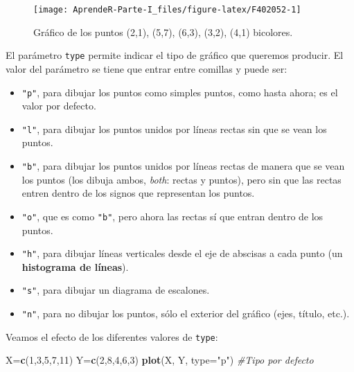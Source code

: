 \documentclass[]{book}
\newenvironment{Shaded}{\begin{snugshade}}{\end{snugshade}}
\newcommand{\CommentTok}[1]{\textcolor[rgb]{0.56,0.35,0.01}{\textit{#1}}}
\newcommand{\DataTypeTok}[1]{\textcolor[rgb]{0.13,0.29,0.53}{#1}}
\newcommand{\DecValTok}[1]{\textcolor[rgb]{0.00,0.00,0.81}{#1}}
\newcommand{\KeywordTok}[1]{\textcolor[rgb]{0.13,0.29,0.53}{\textbf{#1}}}
\newcommand{\NormalTok}[1]{#1}
\newcommand{\StringTok}[1]{\textcolor[rgb]{0.31,0.60,0.02}{#1}}
\providecommand{\tightlist}{%
  \setlength{\itemsep}{0pt}\setlength{\parskip}{0pt}}
\theoremstyle{definition}
\theoremstyle{definition}
\theoremstyle{definition}
\theoremstyle{remark}
\begin{document}
\begin{figure}

{\centering \texttt{[image: AprendeR-Parte-I\_files/figure-latex/F402052-1]} 

}

\caption{Gráfico de los puntos (2,1), (5,7), (6,3), (3,2), (4,1) bicolores.}\label{fig:F402052}
\end{figure}

El parámetro \texttt{type} permite indicar el tipo de gráfico que queremos producir. El valor del parámetro se tiene que entrar entre comillas y puede ser:

\begin{itemize}
\tightlist
\item
  \texttt{"p"}, para dibujar los puntos como simples puntos, como hasta ahora; es el valor por defecto.
\item
  \texttt{"l"}, para dibujar los puntos unidos por líneas rectas sin que se vean los puntos.
\item
  \texttt{"b"}, para dibujar los puntos unidos por líneas rectas de manera que se vean los puntos (los dibuja ambos, \emph{both}: rectas y puntos), pero sin que las rectas entren dentro de los signos que representan los puntos.
\item
  \texttt{"o"}, que es como \texttt{"b"}, pero ahora las rectas sí que entran dentro de los puntos.
\item
  \texttt{"h"}, para dibujar líneas verticales desde el eje de abscisas a cada punto (un \textbf{histograma de líneas}).
\item
  \texttt{"s"}, para dibujar un diagrama de escalones.
\item
  \texttt{"n"}, para no dibujar los puntos, sólo el exterior del gráfico (ejes, título, etc.).
\end{itemize}

Veamos el efecto de los diferentes valores de \texttt{type}:

\begin{Shaded}
\begin{Highlighting}[]
\NormalTok{X=}\KeywordTok{c}\NormalTok{(}\DecValTok{1}\NormalTok{,}\DecValTok{3}\NormalTok{,}\DecValTok{5}\NormalTok{,}\DecValTok{7}\NormalTok{,}\DecValTok{11}\NormalTok{)}
\NormalTok{Y=}\KeywordTok{c}\NormalTok{(}\DecValTok{2}\NormalTok{,}\DecValTok{8}\NormalTok{,}\DecValTok{4}\NormalTok{,}\DecValTok{6}\NormalTok{,}\DecValTok{3}\NormalTok{)}
\KeywordTok{plot}\NormalTok{(X, Y, }\DataTypeTok{type=}\StringTok{"p"}\NormalTok{)  }\CommentTok{#Tipo por defecto}
\end{Highlighting}
\end{Shaded}
\end{document}
